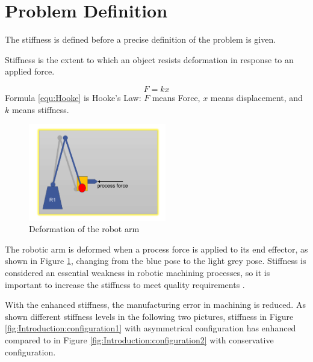 \section{Problem Definition} \label{sec:Introduction:Problem Definition}
The stiffness is defined before a precise definition of the problem is given.\par
\begin{definition}[Stiffness]
	Stiffness is the extent to which an object resists deformation in response to an applied force. \cite{swms}
\end{definition}
\begin{equation} \label{equ:Hooke}
F =  kx
\end{equation}
Formula \ref{equ:Hooke} is Hooke’s Law: $F$ means Force, $x$ means displacement, and $k$ means stiffness.\par
\begin{figure}[h!]
	\centering
	\includegraphics[width=6cm]{03_images/stiff.pdf}
	\caption{Deformation of the robot arm}
	\label{fig:Introduction:stiff}
\end{figure}
The robotic arm is deformed when a process force is applied to its end effector, as shown in Figure \ref{fig:Introduction:stiff}, changing from the blue pose to the light grey pose. Stiffness is considered an essential weakness in robotic machining processes, so it is important to increase the stiffness to meet quality requirements \cite{WPOIR}.\par
With the enhanced stiffness, the manufacturing error in machining is reduced. As shown different stiffness levels in the following two pictures, stiffness in Figure \ref{fig:Introduction:configuration1} with asymmetrical configuration has enhanced compared to in Figure \ref{fig:Introduction:configuration2} with conservative configuration.\par
